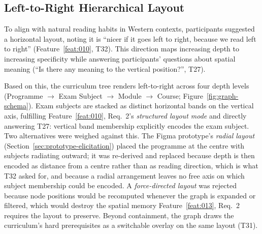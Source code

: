 \subsection{Left-to-Right Hierarchical Layout}
\label{sec:graph-ltr}
To align with natural reading habits in Western contexts, participants suggested a horizontal layout, noting it is \enquote{nicer if it goes left to right, because we read left to right} (Feature~\ref{feat:010}, T32). This direction maps increasing depth to increasing specificity while answering participants' questions about spatial meaning (\enquote{Is there any meaning to the vertical position?}, T27).

Based on this, the curriculum tree renders left-to-right across four depth levels (Programme $\to$ Exam Subject $\to$ Module $\to$ Course; Figure~\ref{fig:graph-schema}). Exam subjects are stacked as distinct horizontal bands on the vertical axis, fulfilling Feature~\ref{feat:010}, Req.~2's \emph{structured layout mode} and directly answering T27: vertical band membership explicitly encodes the exam subject. Two alternatives were weighed against this. The Figma prototype's \emph{radial layout} (Section~\ref{sec:prototype-elicitation}) placed the programme at the centre with subjects radiating outward; it was re-derived and replaced because depth is then encoded as distance from a centre rather than as reading direction, which is what T32 asked for, and because a radial arrangement leaves no free axis on which subject membership could be encoded. A \emph{force-directed layout} was rejected because node positions would be recomputed whenever the graph is expanded or filtered, which would destroy the spatial memory Feature~\ref{feat:013}, Req.~2 requires the layout to preserve. Beyond containment, the graph draws the curriculum's hard prerequisites as a switchable overlay on the same layout (T31).

